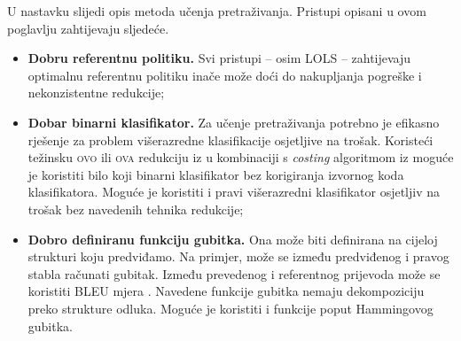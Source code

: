 U nastavku slijedi opis metoda učenja pretraživanja. Pristupi opisani u ovom
poglavlju zahtijevaju sljedeće.

\begin{itemize}

  \item \textbf{Dobru referentnu politiku.} Svi pristupi -- osim \textsc{LOLS} --
  zahtijevaju optimalnu referentnu politiku inače može doći do nakupljanja
  pogreške  i nekonzistentne redukcije;

  \item \textbf{Dobar binarni klasifikator.} Za učenje pretraživanja potrebno je
  efikasno rješenje za problem višerazredne klasifikacije osjetljive na trošak.
  Koristeći težinsku \textsc{ovo} ili \textsc{ova}  redukciju iz \citep{beygelzimer2005error,
  beygelzimer2005weighted} u kombinaciji s \textit{costing} algoritmom iz
  \citep{zadrozny2003cost} moguće je koristiti bilo koji binarni klasifikator
  bez korigiranja izvornog koda klasifikatora. Moguće je koristiti i pravi
  višerazredni klasifikator osjetljiv na trošak bez navedenih tehnika redukcije;

  \item \textbf{Dobro definiranu funkciju gubitka.} Ona može biti definirana na
  cijeloj strukturi koju predviđamo. Na primjer, može se između predviđenog i
  pravog stabla računati  gubitak. Između prevedenog i
  referentnog prijevoda može se koristiti BLEU mjera . Navedene funkcije gubitka nemaju dekompoziciju preko
  strukture odluka. Moguće je koristiti i funkcije poput Hammingovog gubitka.

\end{itemize}
